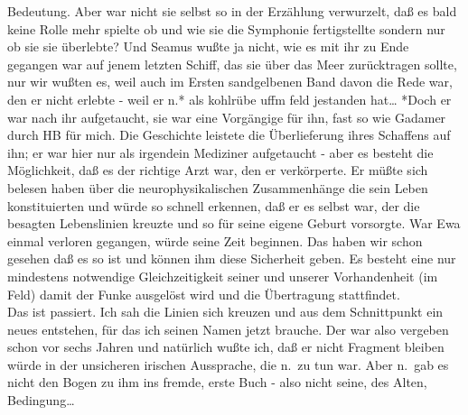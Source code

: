 \documentclass[
]{article}
\begin{document}
Bedeutung. Aber war nicht sie selbst so in der Erzählung verwurzelt, daß
es bald keine Rolle mehr spielte ob und wie sie die Symphonie
fertigstellte sondern nur ob sie sie überlebte? Und Seamus wußte ja
nicht, wie es mit ihr zu Ende gegangen war auf jenem letzten Schiff, das
sie über das Meer zurücktragen sollte, nur wir wußten es, weil auch im
Ersten sandgelbenen Band davon die Rede war, den er nicht erlebte - weil
er n.* als kohlrübe uffm feld jestanden hat\ldots{} *Doch er war nach
ihr aufgetaucht, sie war eine Vorgängige für ihn, fast so wie Gadamer
durch HB für mich. Die Geschichte leistete die Überlieferung ihres
Schaffens auf ihn; er war hier nur als irgendein Mediziner aufgetaucht -
aber es besteht die Möglichkeit, daß es der richtige Arzt war, den er
verkörperte. Er müßte sich belesen haben über die neurophysikalischen
Zusammenhänge die sein Leben konstituierten und würde so schnell
erkennen, daß er es selbst war, der die besagten Lebenslinien kreuzte
und so für seine eigene Geburt vorsorgte. War Ewa einmal verloren
gegangen, würde seine Zeit beginnen. Das haben wir schon gesehen daß es
so ist und können ihm diese Sicherheit geben. Es besteht eine nur
mindestens notwendige Gleichzeitigkeit seiner und unserer Vorhandenheit
(im Feld) damit der Funke ausgelöst wird und die Übertragung
stattfindet.\\
Das ist passiert. Ich sah die Linien sich kreuzen und aus dem
Schnittpunkt ein neues entstehen, für das ich seinen Namen jetzt
brauche. Der war also vergeben schon vor sechs Jahren und natürlich
wußte ich, daß er nicht Fragment bleiben würde in der unsicheren
irischen Aussprache, die n.~zu tun war. Aber n.~gab es nicht den Bogen
zu ihm ins fremde, erste Buch - also nicht seine, des Alten,
Bedingung\ldots{}
\end{document}
